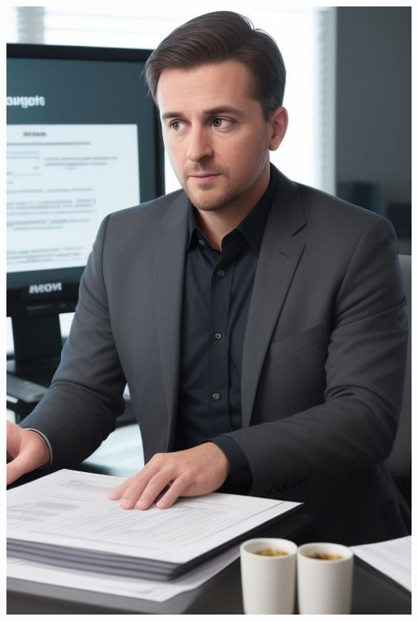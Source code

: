 \begin{minipage}[t]{0.3\textwidth} %
	\vspace{0pt} %
	\centering
	\vspace{0pt}
	\includegraphics[width=\textwidth]{../Draw.io diagrams/alex.jpeg}
\end{minipage}%
\hfill
